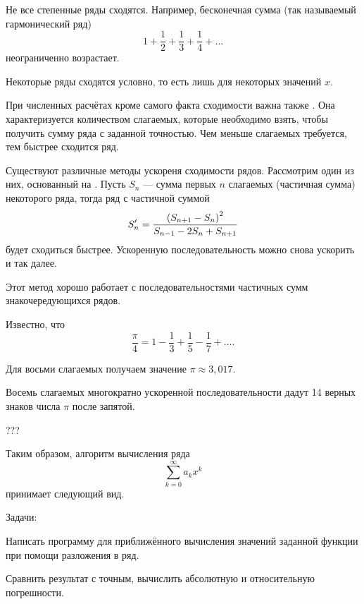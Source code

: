 Не все степенные ряды сходятся. Например, бесконечная сумма (так
называемый гармонический ряд)
\[
1+\frac{1}{2}+\frac{1}{3}+\frac{1}{4}+\ldots
\]
неограниченно возрастает.

Некоторые ряды сходятся условно, то есть лишь для некоторых значений
$x$.

При численных расчётах кроме самого факта сходимости важна также
. Она характеризуется
количеством слагаемых, которые необходимо взять, чтобы получить сумму
ряда с заданной точностью. Чем меньше слагаемых требуется, тем быстрее
сходится ряд.


Существуют различные методы ускореня сходимости рядов. Рассмотрим один из них,
основанный на . Пусть $S_n$ —
сумма первых $n$ слагаемых (частичная сумма) некоторого ряда, тогда
ряд с частичной суммой
\[
S'_n = {\left(S_{n+1} - S_n\right)^2 \over S_{n-1} - 2 S_n + S_{n+1}}
\]
будет сходиться быстрее. Ускоренную последовательность можно снова
ускорить и так далее.

Этот метод хорошо работает с последовательностями частичных сумм
знакочередующихся рядов.

\begin{example}
Известно, что
\[
\frac{\pi}4 = 1 - \frac13 + \frac15 - \frac17 + \ldots.
\]

Для восьми слагаемых получаем значение $\pi \approx 3{,}017$.

Восемь слагаемых многократно ускоренной последовательности дадут 14
верных знаков числа $\pi$ после запятой.
\end{example}

\Practice


???

Таким образом, алгоритм вычисления ряда
\[
\sum_{k=0}^{\infty}a_{k}x^{k}
\]
принимает следующий вид.


%
%

\Tasks

Задачи:

Написать программу для приближённого вычисления значений заданной
функции при помощи разложения в ряд.

Сравнить результат с точным, вычислить абсолютную и относительную
погрешности.


